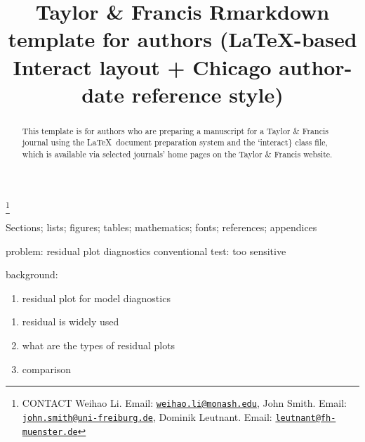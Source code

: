 \documentclass[]{interact}
\theoremstyle{plain}%
\theoremstyle{definition}
\theoremstyle{remark}
\def\tightlist{}
\begin{document}

\title{Taylor \& Francis Rmarkdown template for authors (\LaTeX-based
\textsf{Interact} layout + Chicago author-date reference style)}


\author{
}

\thanks{CONTACT Weihao
Li. Email: \href{mailto:weihao.li@monash.edu}{\nolinkurl{weihao.li@monash.edu}}, John
Smith. Email: \href{mailto:john.smith@uni-freiburg.de}{\nolinkurl{john.smith@uni-freiburg.de}}, Dominik
Leutnant. Email: \href{mailto:leutnant@fh-muenster.de}{\nolinkurl{leutnant@fh-muenster.de}}}

\maketitle

\begin{abstract}
This template is for authors who are preparing a manuscript for a Taylor
\& Francis journal using the \LaTeX~document preparation system and the
`interact\} class file, which is available via selected journals' home
pages on the Taylor \& Francis website.
\end{abstract}

\begin{keywords}
Sections; lists; figures; tables; mathematics; fonts; references;
appendices
\end{keywords}

problem: residual plot diagnostics conventional test: too sensitive

background:

\begin{enumerate}
\def\labelenumi{\arabic{enumi}.}
\tightlist
\item
  residual plot for model diagnostics
\end{enumerate}

\begin{enumerate}
\def\labelenumi{\alph{enumi}.}
\tightlist
\item
  residual is widely used
\item
  what are the types of residual plots
\item
  comparison
\end{enumerate}
\end{document}
